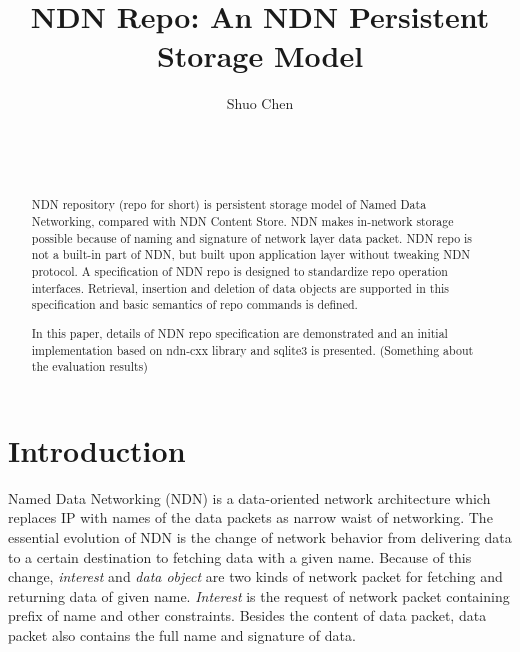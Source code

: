 \documentclass{acm_proc_article-sp}
\begin{document}
\title{NDN Repo: An NDN Persistent Storage Model}


\author{
\alignauthor
Shuo Chen\\
	\\
	\\
	\\
}
\maketitle

\begin{abstract}
NDN repository (repo for short) is persistent storage model of Named Data Networking, compared with NDN Content Store. NDN makes in-network storage possible because of naming and signature of network layer data packet. NDN repo is not a built-in part of NDN, but built upon application layer without tweaking NDN protocol. A specification of NDN repo is designed to standardize repo operation interfaces. Retrieval, insertion and deletion of data objects are supported in this specification and basic semantics of repo commands is defined.

In this paper, details of NDN repo specification are demonstrated and an initial implementation based on ndn-cxx library and sqlite3 is presented. (Something about the evaluation results)

\end{abstract}

\section{Introduction}
Named Data Networking (NDN) \cite{zhang2010named} is a data-oriented network architecture which replaces IP with names of the data packets as narrow waist of networking. The essential evolution of NDN is the change of network behavior from delivering data to a certain destination to fetching data with a given name. \cite{zhang2010named} Because of this change, \emph{interest} and \emph{data object} are two kinds of network packet for fetching and returning data of given name. \emph{Interest} is the request of network packet containing prefix of name and other constraints. Besides the content of data packet, data packet also contains the full name and signature of data.
\end{document}
